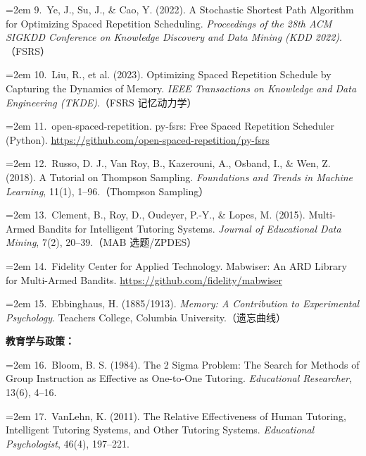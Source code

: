 \documentclass[zihao=-4,a4paper,UTF8,fontset=windows]{ctexart}
\begin{document}
\noindent\hangindent=2em 9.~Ye, J., Su, J., \& Cao, Y. (2022). A Stochastic Shortest Path Algorithm for Optimizing Spaced Repetition Scheduling. \textit{Proceedings of the 28th ACM SIGKDD Conference on Knowledge Discovery and Data Mining (KDD 2022)}.（FSRS）



\noindent\hangindent=2em 10.~Liu, R., et al. (2023). Optimizing Spaced Repetition Schedule by Capturing the Dynamics of Memory. \textit{IEEE Transactions on Knowledge and Data Engineering (TKDE)}.（FSRS 记忆动力学）



\noindent\hangindent=2em 11.~open-spaced-repetition. py-fsrs: Free Spaced Repetition Scheduler (Python). \url{https://github.com/open-spaced-repetition/py-fsrs}



\noindent\hangindent=2em 12.~Russo, D. J., Van Roy, B., Kazerouni, A., Osband, I., \& Wen, Z. (2018). A Tutorial on Thompson Sampling. \textit{Foundations and Trends in Machine Learning}, 11(1), 1–96.（Thompson Sampling）



\noindent\hangindent=2em 13.~Clement, B., Roy, D., Oudeyer, P.-Y., \& Lopes, M. (2015). Multi-Armed Bandits for Intelligent Tutoring Systems. \textit{Journal of Educational Data Mining}, 7(2), 20–39.（MAB 选题/ZPDES）



\noindent\hangindent=2em 14.~Fidelity Center for Applied Technology. Mabwiser: An ARD Library for Multi-Armed Bandits. \url{https://github.com/fidelity/mabwiser}



\noindent\hangindent=2em 15.~Ebbinghaus, H. (1885/1913). \textit{Memory: A Contribution to Experimental Psychology}. Teachers College, Columbia University.（遗忘曲线）



\textbf{教育学与政策：}



\noindent\hangindent=2em 16.~Bloom, B. S. (1984). The 2 Sigma Problem: The Search for Methods of Group Instruction as Effective as One-to-One Tutoring. \textit{Educational Researcher}, 13(6), 4–16.



\noindent\hangindent=2em 17.~VanLehn, K. (2011). The Relative Effectiveness of Human Tutoring, Intelligent Tutoring Systems, and Other Tutoring Systems. \textit{Educational Psychologist}, 46(4), 197–221.
\end{document}
